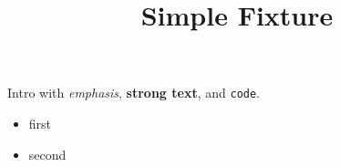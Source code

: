 \title{Simple Fixture}

Intro with \emph{emphasis}, \textbf{strong text}, and \texttt{code}.

\begin{itemize}
\item first
\item second
\end{itemize}
